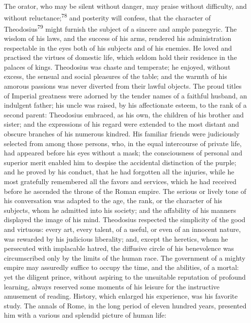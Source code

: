 The orator, who may be silent without danger, may praise without
difficulty, and without reluctance;\textsuperscript{78} and posterity will
confess, that the character of Theodosius\textsuperscript{79} might furnish the
subject of a sincere and ample panegyric. The wisdom of his laws,
and the success of his arms, rendered his administration
respectable in the eyes both of his subjects and of his enemies.
He loved and practised the virtues of domestic life, which seldom
hold their residence in the palaces of kings. Theodosius was
chaste and temperate; he enjoyed, without excess, the sensual and
social pleasures of the table; and the warmth of his amorous
passions was never diverted from their lawful objects. The proud
titles of Imperial greatness were adorned by the tender names of
a faithful husband, an indulgent father; his uncle was raised, by
his affectionate esteem, to the rank of a second parent:
Theodosius embraced, as his own, the children of his brother and
sister; and the expressions of his regard were extended to the
most distant and obscure branches of his numerous kindred. His
familiar friends were judiciously selected from among those
persons, who, in the equal intercourse of private life, had
appeared before his eyes without a mask; the consciousness of
personal and superior merit enabled him to despise the accidental
distinction of the purple; and he proved by his conduct, that he
had forgotten all the injuries, while he most gratefully
remembered all the favors and services, which he had received
before he ascended the throne of the Roman empire. The serious or
lively tone of his conversation was adapted to the age, the rank,
or the character of his subjects, whom he admitted into his
society; and the affability of his manners displayed the image of
his mind. Theodosius respected the simplicity of the good and
virtuous: every art, every talent, of a useful, or even of an
innocent nature, was rewarded by his judicious liberality; and,
except the heretics, whom he persecuted with implacable hatred,
the diffusive circle of his benevolence was circumscribed only by
the limits of the human race. The government of a mighty empire
may assuredly suffice to occupy the time, and the abilities, of a
mortal: yet the diligent prince, without aspiring to the
unsuitable reputation of profound learning, always reserved some
moments of his leisure for the instructive amusement of reading.
History, which enlarged his experience, was his favorite study.
The annals of Rome, in the long period of eleven hundred years,
presented him with a various and splendid picture of human life:
